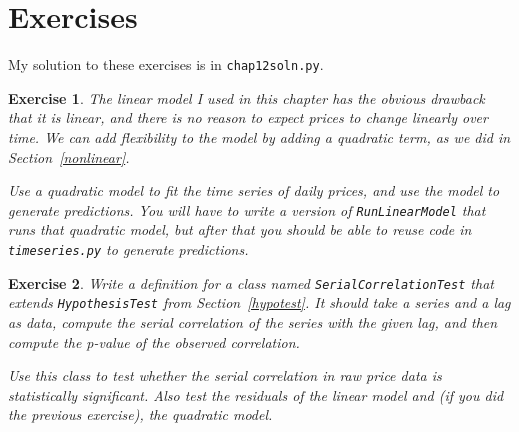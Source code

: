 \documentclass[12pt]{book}
\theoremstyle{exercise}
\newtheorem{exercise}{Exercise}[chapter]
\begin{document}
\section{Exercises}

My solution to these exercises is in \verb"chap12soln.py".

\begin{exercise}
The linear model I used in this chapter has the obvious drawback
that it is linear, and there is no reason to expect prices to
change linearly over time.
We can add flexibility to the model by adding a quadratic term,
as we did in Section~\ref{nonlinear}.%
%
%

Use a quadratic model to fit the time series of daily prices,
and use the model to generate predictions.  You will have to
write a version of {\tt RunLinearModel} that runs that quadratic
model, but after that you should be able to reuse code in
{\tt timeseries.py} to generate predictions.%

\end{exercise}

\begin{exercise}
Write a definition for a class named {\tt SerialCorrelationTest}
that extends {\tt HypothesisTest} from Section~\ref{hypotest}.
It should take a series and a lag as data, compute the serial
correlation of the series with the given lag, and then compute
the p-value of the observed correlation.%
%
%

Use this class to test whether the serial correlation in raw
price data is statistically significant.  Also test the residuals
of the linear model and (if you did the previous exercise),
the quadratic model.%
%
%

\end{exercise}
\end{document}
